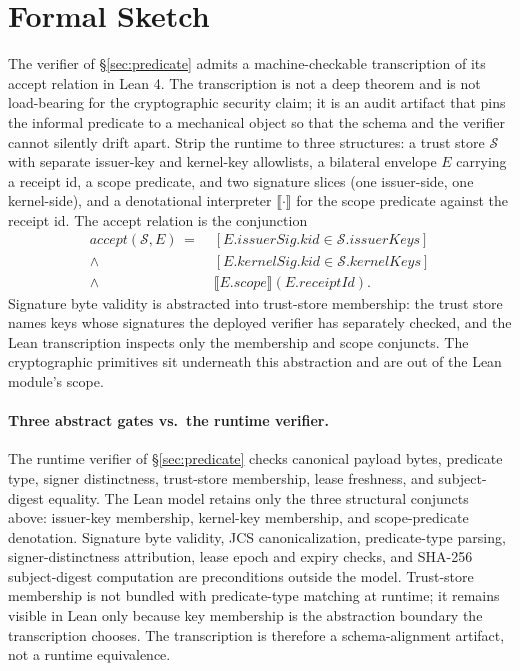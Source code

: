 \section{Formal Sketch}
\label{sec:formal}

The verifier of \S\ref{sec:predicate} admits a machine-checkable transcription of its accept relation in Lean 4. The transcription is not a deep theorem and is not load-bearing for the cryptographic security claim; it is an audit artifact that pins the informal predicate to a mechanical object so that the schema and the verifier cannot silently drift apart. Strip the runtime to three structures: a trust store $\mathcal{S}$ with separate issuer-key and kernel-key allowlists, a bilateral envelope $E$ carrying a receipt id, a scope predicate, and two signature slices (one issuer-side, one kernel-side), and a denotational interpreter $\llbracket\cdot\rrbracket$ for the scope predicate against the receipt id. The accept relation is the conjunction
\begin{align*}
  \mathit{accept}(\mathcal{S},E) \,=\;
    & [E.\mathit{issuerSig}.\mathit{kid} \in \mathcal{S}.\mathit{issuerKeys}] \\
    {}\wedge{} & [E.\mathit{kernelSig}.\mathit{kid} \in \mathcal{S}.\mathit{kernelKeys}] \\
    {}\wedge{} & \llbracket E.\mathit{scope}\rrbracket(E.\mathit{receiptId}).
\end{align*}
Signature byte validity is abstracted into trust-store membership: the trust store names keys whose signatures the deployed verifier has separately checked, and the Lean transcription inspects only the membership and scope conjuncts. The cryptographic primitives sit underneath this abstraction and are out of the Lean module's scope.

\paragraph{Three abstract gates vs.\ the runtime verifier.} The runtime verifier of \S\ref{sec:predicate} checks canonical payload bytes, predicate type, signer distinctness, trust-store membership, lease freshness, and subject-digest equality. The Lean model retains only the three structural conjuncts above: issuer-key membership, kernel-key membership, and scope-predicate denotation. Signature byte validity, JCS canonicalization, predicate-type parsing, signer-distinctness attribution, lease epoch and expiry checks, and SHA-256 subject-digest computation are preconditions outside the model. Trust-store membership is not bundled with predicate-type matching at runtime; it remains visible in Lean only because key membership is the abstraction boundary the transcription chooses. The transcription is therefore a schema-alignment artifact, not a runtime equivalence.

